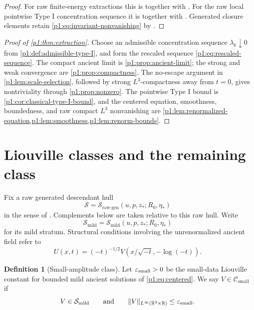 \documentclass[11pt]{amsart}
\theoremstyle{plain}
\theoremstyle{definition}
\newtheorem{definition}[definition]{Definition}
\theoremstyle{remark}
\numberwithin{equation}{section}
\newcommand{\R}{\mathbb R}
\newcommand{\calS}{\mathcal S}
\newcommand{\calC}{\mathcal C}
\begin{document}
\begin{proof}
For raw finite-energy extractions this is
 together
with .  For the
raw local pointwise Type I concentration sequence it is
together with .
Generated closure elements retain
\eqref{p1:eq:invariant-nonvanishing} by
.
\end{proof}

\begin{proof}[Proof of \cref{p1:thm:extraction}]
Choose an admissible concentration sequence
\(\lambda_k\downarrow0\) from \cref{p1:def:admissible-type-I}, and form the
rescaled sequence \eqref{p1:eq:rescaled-sequence}.  The compact ancient limit is
\cref{p1:prop:ancient-limit}; the strong and weak convergence are
\cref{p1:prop:compactness}.  The no-escape argument in
\cref{p1:lem:scale-selection}, followed by strong \(L^3\)-compactness away from
\(t=0\), gives nontriviality through \cref{p1:prop:nonzero}.  The pointwise
Type I bound is \cref{p1:cor:classical-type-I-bound}, and the centered equation,
smoothness, boundedness, and raw compact \(L^3\) nonvanishing are
\cref{p1:lem:renormalized-equation,p1:lem:smoothness,p1:lem:renorm-bounds}.
\end{proof}

\section{Liouville classes and the remaining class}\label{p1:sec:classes}

Fix a raw generated descendant hull
\[
   \calS=\calS_{\mathrm{raw\text{-}gen}}(u,p,z_*;R_0,\eta_*)
\]
in the sense of .  Complements below
are taken relative to this raw hull.  Write
\[
   \calS_{\mathrm{mild}}
   =
   \calS_{\mathrm{mild}}(u,p,z_*;R_0,\eta_*)
\]
for its mild stratum.  Structural conditions involving the unrenormalized
ancient field refer to
\[
   U(x,t)=(-t)^{-1/2}V(x/\sqrt{-t},-\log(-t)).
\]

\begin{definition}[Small-amplitude class]\label{p1:def:small-class}
Let \(\varepsilon_{\rm small}>0\) be the small-data Liouville constant for
bounded mild ancient solutions of \eqref{p1:eq:centered}.  We say
\(V\in\calC_{\mathrm{small}}\) if
\[
   V\in\calS_{\mathrm{mild}}
   \qquad\text{and}\qquad
   \|V\|_{L^\infty(\R^3\times\R)}\le \varepsilon_{\rm small}.
\]
\end{definition}
\end{document}
